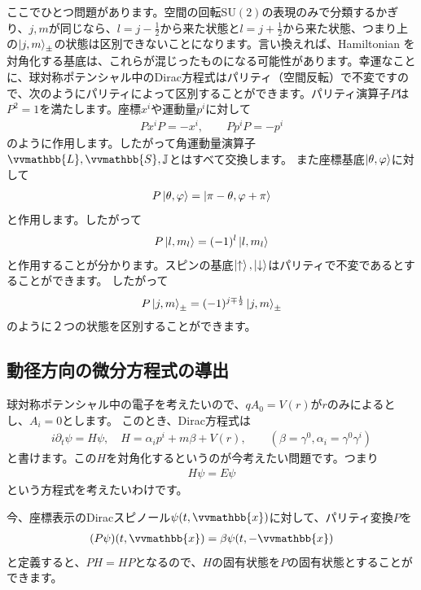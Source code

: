 \documentclass[report,paper=a4, fontsize=12pt, line_length=16cm, number_of_lines=33,dvipdfmx]{jlreq}
\numberwithin{equation}{chapter}
\newcommand{\del}{\partial}
\newcommand{\xb}{\vvmathbb{x}}
\newcommand{\Lb}{\vvmathbb{L}}
\newcommand{\Sb}{\vvmathbb{S}}
\newcommand{\Jb}{\mathbb{J}}
\newcommand{\uket}{\ket{\uparrow}}
\newcommand{\dket}{\ket{\downarrow}}
\begin{document}
ここでひとつ問題があります。空間の回転SU$(2)$の表現のみで分類するかぎり、$j,m$が同じなら、$l=j-\frac12$から来た状態と$l=j+\frac12$から来た状態、つまり上の$\ket{j,m}_{\pm}$の状態は区別できないことになります。言い換えれば、Hamiltonian を対角化する基底は、これらが混じったものになる可能性があります。幸運なことに、球対称ポテンシャル中のDirac方程式はパリティ（空間反転）で不変ですので、次のようにパリティによって区別することができます。パリティ演算子$P$は$P^2=1$を満たします。座標$x^i$や運動量$p^{i}$に対して
\begin{align*}
  Px^{i}P=-x^{i},\qquad Pp^{i}P=-p^{i}
\end{align*}
のように作用します。したがって角運動量演算子$\Lb,\Sb,\Jb$とはすべて交換します。
また座標基底$\ket{\theta,\varphi}$に対して
\begin{align*}
  P\ket{\theta,\varphi}=\ket{\pi-\theta,\varphi+\pi}
\end{align*}
と作用します。したがって
\begin{align*}
  P\ket{l,m_l}=(-1)^{l}\ket{l,m_l}
\end{align*}
と作用することが分かります。スピンの基底$\uket,\dket$はパリティで不変であるとすることができます。
したがって
\begin{align*}
  P\ket{j,m}_{\pm}=(-1)^{j\mp \frac12}\ket{j,m}_{\pm}
\end{align*}
のように２つの状態を区別することができます。

\subsection{動径方向の微分方程式の導出}
球対称ポテンシャル中の電子を考えたいので、$qA_{0}=V(r)$が$r$のみによるとし、$A_i=0$とします。
このとき、Dirac方程式は
\begin{align*}
  i\del_{t}\psi=H\psi,\quad H=\alpha_i p^{i}+m\beta+V(r),\qquad (\beta=\gamma^{0},\alpha_i=\gamma^{0}\gamma^{i})
\end{align*}
と書けます。この$H$を対角化するというのが今考えたい問題です。つまり
\begin{align}
  H\psi=E\psi
  \label{eigeneq}
\end{align}
という方程式を考えたいわけです。

今、座標表示のDiracスピノール$\psi(t,\xb)$に対して、パリティ変換$P$を
\begin{align*}
  (P\psi)(t,\xb)=\beta\psi(t,-\xb)
\end{align*}
と定義すると、$PH=HP$となるので、$H$の固有状態を$P$の固有状態とすることができます。
\end{document}
